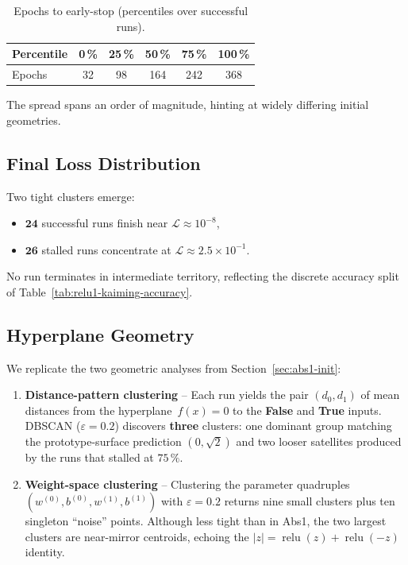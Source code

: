 \begin{table}[h]
\centering
\caption{Epochs to early-stop (percentiles over successful runs).}
\label{tab:relu1-kaiming-epochs}
\begin{tabular}{lccccc}
\toprule
Percentile & 0\,\% & 25\,\% & 50\,\% & 75\,\% & 100\,\% \\ \midrule
Epochs & 32 & 98 & 164 & 242 & 368 \\ \bottomrule
\end{tabular}
\end{table}

The spread spans an order of magnitude, hinting at widely differing
initial geometries.

\subsection*{Final Loss Distribution}

Two tight clusters emerge:
\begin{itemize}
  \item $\mathbf{24}$ successful runs finish near
        $\mathcal L\!\approx\!10^{-8}$,
  \item $\mathbf{26}$ stalled runs concentrate at
        $\mathcal L\!\approx\!2.5\times10^{-1}$.
\end{itemize}
No run terminates in intermediate territory, reflecting the discrete
accuracy split of Table~\ref{tab:relu1-kaiming-accuracy}.

\subsection*{Hyperplane Geometry}
\label{sec:relu1-hyperplane-geometry}

We replicate the two geometric analyses from
Section~\ref{sec:abs1-init}:

\begin{enumerate}[label=(G\arabic*)]
    \item \textbf{Distance-pattern clustering} –  
          Each run yields the pair
          $(d_{0},d_{1})$ of mean distances from the hyperplane~$f(x)=0$
          to the \textbf{False} and \textbf{True} inputs.
          DBSCAN ($\varepsilon=0.2$) discovers \textbf{three} clusters:  
          one dominant group matching the prototype-surface prediction
          $(0,\sqrt2)$ and two looser satellites produced by the runs that
          stalled at $75\,\%$.
    \item \textbf{Weight-space clustering} –  
          Clustering the parameter quadruples
          $(w^{(0)},b^{(0)},w^{(1)},b^{(1)})$
          with $\varepsilon=0.2$ returns
          nine small clusters plus ten singleton “noise” points.
          Although less tight than in Abs1, the two largest clusters are
          near-mirror centroids, echoing the
          $|z|=\operatorname{relu}(z)+\operatorname{relu}(-z)$ identity.
\end{enumerate}

